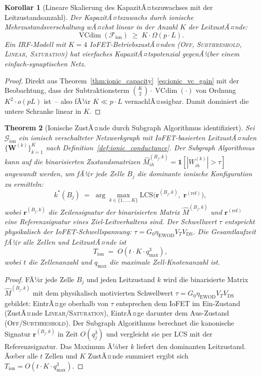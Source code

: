 ﻿\documentclass[12pt, a4paper, openany]{report}
\newtheorem{theorem}{Theorem}[chapter]
\newtheorem{corollary}[theorem]{Korollar}
\newcommand{\calG}{\mathcal{G}}
\newcommand{\calF}{\mathcal{F}}
\DeclareMathOperator{\VC}{VCdim}
\begin{document}
\begin{corollary}[Lineare Skalierung des KapazitÃ¤tszuwachses mit der Leitzustandsanzahl]
\label{cor:ionic_linear}
Der KapazitÃ¤tszuwachs durch ionische Mehrzustandsverschaltung wÃ¤chst
linear in der Anzahl $K$ der LeitzustÃ¤nde:
\[
  \VC(\calF_{\mathrm{ion}}) \;\geq\; K \cdot \Omega(p \cdot L).
\]
Ein IRF-Modell mit $K = 4$ IoFET-BetriebszustÃ¤nden
(\textsc{Off}, \textsc{Subthreshold}, \textsc{Linear}, \textsc{Saturation})
hat vierfaches KapazitÃ¤tspotenzial gegenÃ¼ber einem einfach-synaptischen Netz.
\end{corollary}

\begin{proof}
Direkt aus Theorem~\ref{thm:ionic_capacity}~\eqref{eq:ionic_vc_gain} mit
der Beobachtung, dass der Subtraktionsterm $\binom{K}{2}\cdot\VC(\cdot)$
von Ordnung $K^2 \cdot o(pL)$ ist~-- also fÃ¼r $K \ll p\cdot L$ vernachlÃ¤ssigbar.
Damit dominiert die untere Schranke linear in $K$.
\end{proof}

\begin{theorem}[Ionische ZustÃ¤nde durch Subgraph Algorithmus identifiziert]
\label{thm:ionic_subgraph}
Sei $\calG_{\mathrm{ion}}$ ein ionisch verschalteter Netzwerkgraph mit
IoFET-basierten LeitzustÃ¤nden $\{\bm{W}^{(k)}\}_{k=1}^K$ nach
Definition~\ref{def:ionic_conductance}.  Der Subgraph Algorithmus kann auf
die binarisierten Zustandsmatrizen
$\hat{M}^{(B_j,k)}_{ih} = \mathbf{1}[|W^{(k)}_{ih}| > \tau]$
angewandt werden, um fÃ¼r jede Zelle $B_j$ die \emph{dominante ionische
Konfiguration} zu ermitteln:
\begin{equation}
  \label{eq:ionic_dominant}
  k^*(B_j)
  \;=\; \arg\max_{k \in \{1,\ldots,K\}}
  \mathrm{LCS}\!\bigl(\bm{r}^{(B_j, k)},\; \bm{r}^{(\mathrm{ref})}\bigr),
\end{equation}
wobei $\bm{r}^{(B_j, k)}$ die Zeilensignatur der binarisierten Matrix
$\hat{M}^{(B_j,k)}$ und $\bm{r}^{(\mathrm{ref})}$ eine
Referenzsignatur eines Ziel-Leitverhaltens sind.
Der Schwellwert $\tau$ entspricht physikalisch der IoFET-Schwellspannung:
$\tau = G_0 \eta_{\mathrm{EWOD}} V_T V_{\mathrm{DS}}$.
Die Gesamtlaufzeit fÃ¼r alle Zellen und LeitzustÃ¤nde ist
\[
  T_{\mathrm{ion}} \;=\; O(t \cdot K \cdot q_{\max}^3),
\]
wobei $t$ die Zellenanzahl und $q_{\max}$ die maximale Zell-Knotenanzahl ist.
\end{theorem}

\begin{proof}
FÃ¼r jede Zelle $B_j$ und jeden Leitzustand $k$ wird die binarisierte
Matrix $\hat{M}^{(B_j,k)}$ mit dem physikalisch motivierten Schwell\-wert
$\tau = G_0 \eta_{\mathrm{EWOD}} V_T V_\mathrm{DS}$ gebildet: EintrÃ¤ge
oberhalb von $\tau$ entsprechen dem IoFET im Ein-Zustand (ZustÃ¤nde
\textsc{Linear}/\textsc{Saturation}), EintrÃ¤ge darunter dem Aus-Zustand
(\textsc{Off}/\textsc{Subthreshold}).  Der Subgraph Algorithmus berechnet
die kanonische Signatur $\bm{r}^{(B_j, k)}$ in Zeit $O(q_j^3)$ und
vergleicht sie per LCS mit der Referenzsignatur.  Das Maximum Ã¼ber $k$
liefert den dominanten Leitzustand.  Ãœber alle $t$ Zellen und $K$ ZustÃ¤nde
summiert ergibt sich $T_{\mathrm{ion}} = O(t \cdot K \cdot q_{\max}^3)$.
\end{proof}
\end{document}
